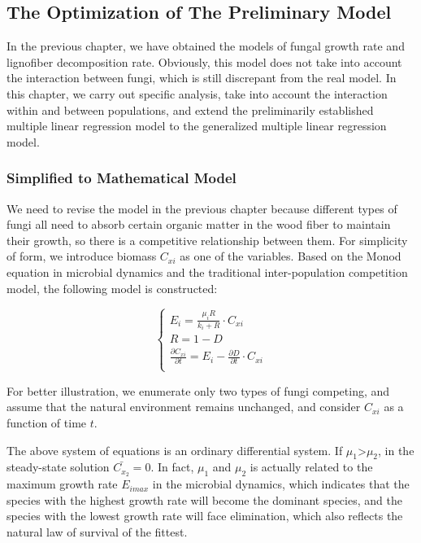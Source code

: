 \documentclass[12pt]{article}
\begin{document}
\subsection{The Optimization of The Preliminary Model}
In the previous chapter, we have obtained the models of fungal growth rate and lignofiber decomposition rate. Obviously, this model does not take into account the interaction between fungi, which is still discrepant from the real model.
In this chapter, we carry out specific analysis, take into account the interaction within and between populations, and extend the preliminarily established multiple linear regression model to the generalized multiple linear regression model.


\subsubsection{Simplified to Mathematical Model}

We need to revise the model in the previous chapter because different types of fungi all need to absorb certain organic matter in the wood fiber to maintain their growth, so there is a competitive relationship between them. For simplicity of form, we introduce biomass $C_{xi}$ as one of the variables. Based on the Monod equation in microbial dynamics and the traditional inter-population competition model, the following model is constructed\cite{14}:\par

\begin{equation}
	\begin{cases}
		E_{i} = \frac{\mu_{i}R}{k_{i}+R} \cdot C_{xi} \\
		R=1-D\\
		\frac{\partial C_{xi}}{\partial t} = E_i - \frac{\partial D}{\partial t} \cdot C_{xi}\\
	\end{cases}
	\label{con:you-hua-hou}
\end{equation}

For better illustration, we enumerate only two types of fungi competing, and assume that the natural environment remains unchanged, and consider $C_{xi}$ as a function of time $t$.

The above system of equations is an ordinary differential system. If $\mu_1$>$\mu_2$, in the steady-state solution $\bar{C_{x_2}} = 0$. In fact, $\mu_1$ and $\mu_2$ is actually related to the maximum growth rate $E_{imax}$ in the microbial dynamics, which indicates that the species with the highest growth rate will become the dominant species, and the species with the lowest growth rate will face elimination, which also reflects the natural law of survival of the fittest.
\end{document}
